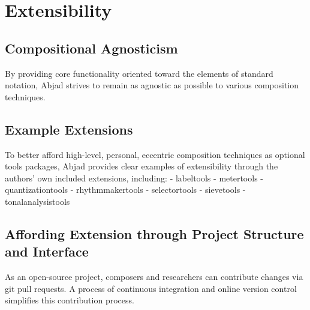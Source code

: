 \section{Extensibility}\label{sec:extensibility}
\subsection{Compositional Agnosticism}
     By providing core functionality oriented toward the elements of standard notation, Abjad strives to remain as agnostic as possible to various composition techniques. 
\subsection{Example Extensions}
To better afford high-level, personal, eccentric composition techniques as optional tools packages, Abjad provides clear examples of extensibility through the authors' own included extensions, including: 
        - labeltools
        - metertools
        - quantizationtools
        - rhythmmakertools
        - selectortools
        - sievetools
        - tonalanalysistools
\subsection{Affording Extension through Project Structure and Interface}
As an open-source project, composers and researchers can contribute changes via git pull requests. A process of continuous integration and online version control simplifies this contribution process. 
